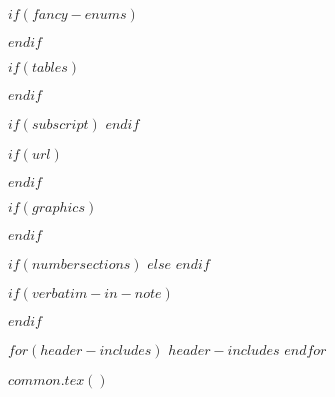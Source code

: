 $if(fancy-enums)$
\makeatletter\AtBeginDocument{%
  \renewcommand{\@listi}
    {\setlength{\labelwidth}{4em}}
}\makeatother
\usepackage{enumerate}
$endif$

$if(tables)$
\usepackage{array}
\newcommand{\PreserveBackslash}[1]{\let\temp=\\#1\let\\=\temp}
\let\PBS=\PreserveBackslash
$endif$

$if(subscript)$
\newcommand{\textsubscr}[1]{\ensuremath{_{\scriptsize\textrm{#1}}}}
$endif$

\usepackage[breaklinks=true]{hyperref}
\hypersetup{colorlinks,%
citecolor=blue,%
filecolor=blue,%
linkcolor=blue,%
urlcolor=blue}

$if(url)$
\usepackage{url}
$endif$

$if(graphics)$
\usepackage{graphicx}
\makeatletter
\def\maxwidth{\ifdim\Gin@nat@width>\linewidth\linewidth
\else\Gin@nat@width\fi}
\makeatother
\let\Oldincludegraphics\includegraphics
\renewcommand{\includegraphics}[1]{\Oldincludegraphics[width=\maxwidth]{#1}}
$endif$

$if(numbersections)$
$else$
\setcounter{secnumdepth}{0}
$endif$

$if(verbatim-in-note)$
\usepackage{fancyvrb}
\VerbatimFootnotes
$endif$

$for(header-includes)$
$header-includes$
$endfor$

$common.tex()$